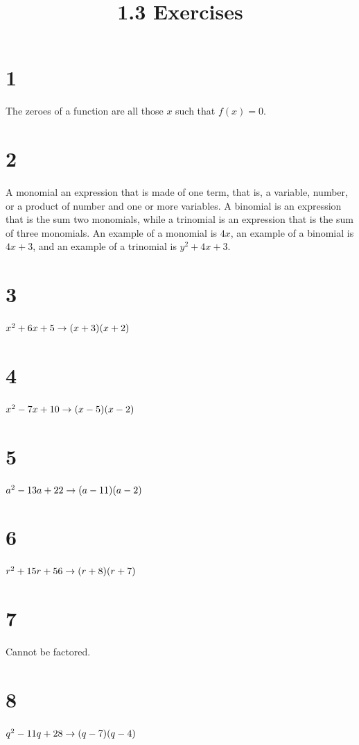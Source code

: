 \documentclass{article}
\title{1.3 Exercises}
\theoremstyle{definition}
\begin{document}
\maketitle

\section*{1}
The zeroes of a function are all those $x$ such that $f(x)=0$.

\section*{2}
A monomial an expression that is made of one term, that is, a variable, number, or a product of number and one or more variables. A binomial is an expression
 that is the sum two monomials, while a trinomial is an expression that is the sum of three monomials. An example of a monomial is $4x$, an example of a binomial is $4x+3$, and 
an example of a trinomial is $y^2+4x+3$.

\section*{3}
$x^2+6x+5\newline\rightarrow (x+3)(x+2)$

\section*{4}
$x^2-7x+10\newline\rightarrow (x-5)(x-2)$

\section*{5}
$a^2-13a+22\newline\rightarrow (a-11)(a-2)$

\section*{6}
$r^2+15r+56\newline\rightarrow (r+8)(r+7)$

\section*{7}
Cannot be factored.

\section*{8}
$q^2-11q+28\newline\rightarrow (q-7)(q-4)$
\end{document}
